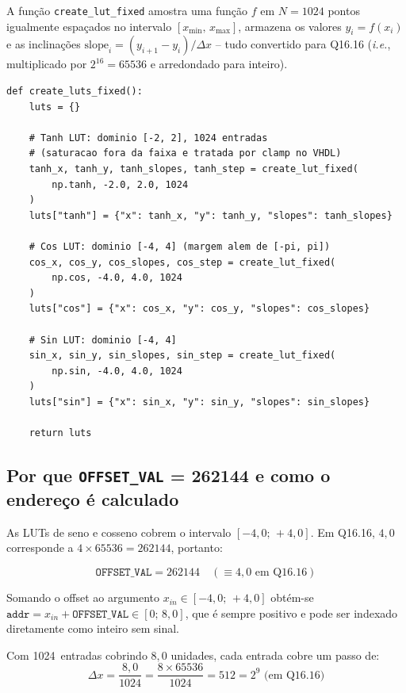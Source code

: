 \documentclass[a4paper,12pt]{article}
\begin{document}
A fun\c{c}\~ao \texttt{create\_lut\_fixed} amostra uma fun\c{c}\~ao $f$ em $N = 1024$ pontos
igualmente espa\c{c}ados no intervalo $[x_{\min},\, x_{\max}]$, armazena os valores $y_i = f(x_i)$
e as inclina\c{c}\~oes $\text{slope}_i = (y_{i+1} - y_i)/\Delta x$ -- tudo convertido para Q16.16
(\textit{i.e.}, multiplicado por $2^{16} = 65536$ e arredondado para inteiro).

\begin{lstlisting}[style=pystyle,
    caption={Gera\c{c}\~ao das LUTs trigonometricas e de tanh em ponto fixo.},
    label={lst:create_luts}]
def create_luts_fixed():
    luts = {}

    # Tanh LUT: dominio [-2, 2], 1024 entradas
    # (saturacao fora da faixa e tratada por clamp no VHDL)
    tanh_x, tanh_y, tanh_slopes, tanh_step = create_lut_fixed(
        np.tanh, -2.0, 2.0, 1024
    )
    luts["tanh"] = {"x": tanh_x, "y": tanh_y, "slopes": tanh_slopes}

    # Cos LUT: dominio [-4, 4] (margem alem de [-pi, pi])
    cos_x, cos_y, cos_slopes, cos_step = create_lut_fixed(
        np.cos, -4.0, 4.0, 1024
    )
    luts["cos"] = {"x": cos_x, "y": cos_y, "slopes": cos_slopes}

    # Sin LUT: dominio [-4, 4]
    sin_x, sin_y, sin_slopes, sin_step = create_lut_fixed(
        np.sin, -4.0, 4.0, 1024
    )
    luts["sin"] = {"x": sin_x, "y": sin_y, "slopes": sin_slopes}

    return luts
\end{lstlisting}

\subsection{Por que \texttt{OFFSET\_VAL} = 262144 e como o endere\c{c}o \'e calculado}

As LUTs de seno e cosseno cobrem o intervalo $[-4{,}0;\,+4{,}0]$. Em Q16.16, $4{,}0$
corresponde a $4 \times 65536 = 262144$, portanto:

\[
    \texttt{OFFSET\_VAL} = 262144 \quad (\equiv 4{,}0 \text{ em Q16.16})
\]

Somando o offset ao argumento $x_{in} \in [-4{,}0;\,+4{,}0]$ obt\'em-se
$\texttt{addr} = x_{in} + \texttt{OFFSET\_VAL} \in [0;\,8{,}0]$, que \'e sempre positivo
e pode ser indexado diretamente como inteiro sem sinal.

Com 1024~entradas cobrindo $8{,}0$ unidades, cada entrada cobre um passo de:
\[
    \Delta x = \frac{8{,}0}{1024} = \frac{8 \times 65536}{1024} = 512 = 2^{9} \text{ (em Q16.16)}
\]
\end{document}

